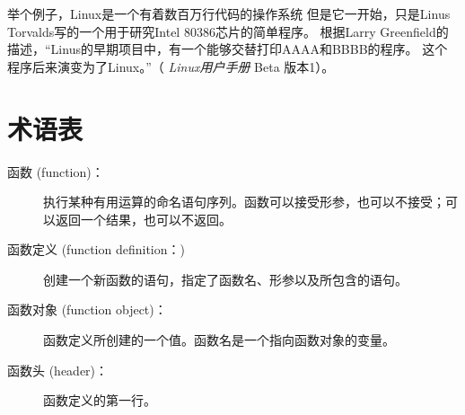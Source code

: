 举个例子，Linux是一个有着数百万行代码的操作系统 但是它一开始，只是Linus
Torvalds写的一个用于研究Intel 80386芯片的简单程序。 根据Larry
Greenfield的描述，“Linus的早期项目中，有一个能够交替打印AAAA和BBBB的程序。
这个程序后来演变为了Linux。”（ {\em Linux用户手册} Beta 版本1）。


%
\section{术语表}

\begin{description}


\item[函数 (function)：] 执行某种有用运算的命名语句序列。函数可以接受形参，也可以不接受；可以返回一个结果，也可以不返回。
  


\item[函数定义 (function definition：)] 创建一个新函数的语句，指定了函数名、形参以及所包含的语句。
  


\item[函数对象 (function object)：] 函数定义所创建的一个值。函数名是一个指向函数对象的变量。
  


\item[函数头 (header)：] 函数定义的第一行。
  


\end{description}
